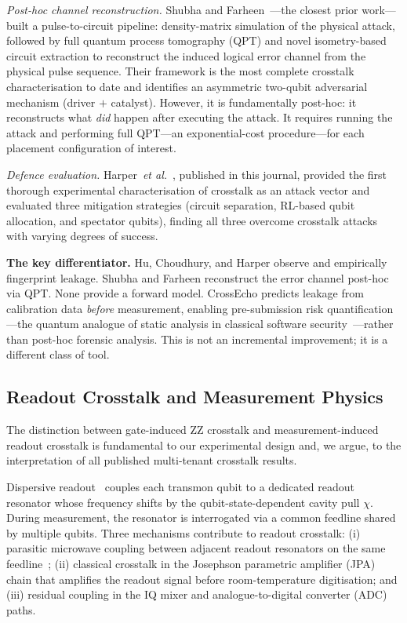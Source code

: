\documentclass[ASNA,twocolumn]{USG}
\begin{document}
\textit{Post-hoc channel reconstruction.} Shubha and Farheen~\cite{shubha2025pulse}---the closest prior work---built a pulse-to-circuit pipeline: density-matrix simulation of the physical attack, followed by full quantum process tomography (QPT) and novel isometry-based circuit extraction to reconstruct the induced logical error channel from the physical pulse sequence. Their framework is the most complete crosstalk characterisation to date and identifies an asymmetric two-qubit adversarial mechanism (driver $+$ catalyst). However, it is fundamentally post-hoc: it reconstructs what \emph{did} happen after executing the attack. It requires running the attack and performing full QPT---an exponential-cost procedure---for each placement configuration of interest.

\textit{Defence evaluation.} Harper~\emph{et al.}~\cite{harper2025crosstalk}, published in this journal, provided the first thorough experimental characterisation of crosstalk as an attack vector and evaluated three mitigation strategies (circuit separation, RL-based qubit allocation, and spectator qubits), finding all three overcome crosstalk attacks with varying degrees of success.

\textbf{The key differentiator.} Hu, Choudhury, and Harper observe and empirically fingerprint leakage. Shubha and Farheen reconstruct the error channel post-hoc via QPT. None provide a forward model. CrossEcho predicts leakage from calibration data \emph{before} measurement, enabling pre-submission risk quantification---the quantum analogue of static analysis in classical software security~\cite{ristenpart2009hey}---rather than post-hoc forensic analysis. This is not an incremental improvement; it is a different class of tool.

\subsection{Readout Crosstalk and Measurement Physics}

The distinction between gate-induced ZZ crosstalk and measurement-induced readout crosstalk is fundamental to our experimental design and, we argue, to the interpretation of all published multi-tenant crosstalk results.

Dispersive readout~\cite{sank2016measurement,heimsoo2018rapid} couples each transmon qubit to a dedicated readout resonator whose frequency shifts by the qubit-state-dependent cavity pull $\chi$. During measurement, the resonator is interrogated via a common feedline shared by multiple qubits. Three mechanisms contribute to readout crosstalk: (i) parasitic microwave coupling between adjacent readout resonators on the same feedline~\cite{mitigating2025measurement}; (ii) classical crosstalk in the Josephson parametric amplifier (JPA) chain that amplifies the readout signal before room-temperature digitisation; and (iii) residual coupling in the IQ mixer and analogue-to-digital converter (ADC) paths.
\end{document}
